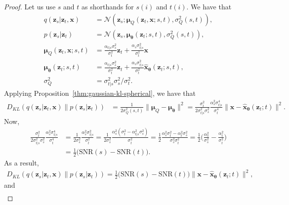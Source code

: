 \documentclass[10pt]{article}
\newcommand{\ve}[1]{\mathbf{#1}}
\newcommand{\ves}[1]{\boldsymbol{#1}}
\newcommand{\mcal}[1]{\mathcal{#1}}
\newcommand{\SNR}{\mathrm{SNR}}
\begin{document}
\begin{itemize}
\begin{proof}
  Let us use $s$ and $t$ as shorthands for $s(i)$ and $t(i)$. We have that
  \begin{align*}
    q(\ve{z}_s | \ve{z}_t, \ve{x})
    &= \mcal{N}(\ve{z}_s; \ves{\mu}_Q(\ve{z}_t, \ve{x}; s,t), \sigma^2_Q(s,t)),\\
    p(\ve{z}_s | \ve{z}_t)
    &= \mcal{N}(\ve{z}_s, \ves{\mu}_{\ves{\theta}}(\ve{z}_t; s, t), \sigma^2_Q(s,t)), \\
    \ves{\mu}_Q(\ve{z}_t, \ve{x}; s,t) 
    &= \frac{\alpha_{t|s}\sigma_s^2}{\sigma_t^2} \ve{z}_t + \frac{\alpha_s \sigma_{t|s}^2}{\sigma_t^2} \ve{x} \\
    \ves{\mu}_{\ves{\theta}}(\ve{z}_t; s, t) 
    &= \frac{\alpha_{t|s}\sigma_s^2}{\sigma_t^2} \ve{z}_t + \frac{\alpha_s \sigma_{t|s}^2}{\sigma_t^2} \hat{\ve{x}}_{\ves{\theta}}(\ve{z}_t; s, t), \\
    \sigma_Q^2 
    &= \sigma_{t|s}^2 \sigma_s^2 / \sigma_t^2.
  \end{align*}
  Applying Proposition~\ref{thm:gaussian-kl-spherical}, we have that
  \begin{align*}
    D_{KL}(
      q(\ve{z}_s | \ve{z}_t, \ve{x})
      \| p(\ve{z}_s | \ve{z}_t) )
    &= \frac{1}{2 \sigma^2_Q(s,t)} \| \ves{\mu}_Q - \ves{\mu}_{\ves{\theta}} \|^2 
    = \frac{\sigma_t^2}{2 \sigma_{t|s}^2 \sigma_s^2} \frac{\alpha_s^2 \sigma_{t|s}^4}{\sigma_t^4} 
    \| \ve{x} - \hat{\ve{x}}_{\ves{\theta}}(\ve{z}_t; t) \|^2.
  \end{align*}
  Now,
  \begin{align*}
    \frac{\sigma_t^2}{2 \sigma_{t|s}^2 \sigma_s^2} \frac{\alpha_s^2 \sigma_{t|s}^4}{\sigma_t^4}
    &= \frac{1}{2 \sigma_s^2} \frac{\alpha_s^2 \sigma_{t|s}^2}{\sigma_t^2}
    = \frac{1}{2 \sigma_s^2} \frac{\alpha_s^2 (\sigma_t^2 - \alpha_{t|s}^2 \sigma_s^2)}{\sigma_t^2}
    = \frac{1}{2} \frac{\alpha_s^2 \sigma_t^2 - \alpha_t^2 \sigma_s^2}{ \sigma_s^2 \sigma_t^2}
    = \frac{1}{2} \bigg( \frac{\alpha_s^2}{\sigma_s^2} - \frac{\alpha_t^2}{\sigma_t^2} \bigg) \\
    &= \frac{1}{2} \big( \SNR(s) - \SNR(t) \big).
  \end{align*}
  As a result,
  \begin{align*}
  D_{KL}(
      q(\ve{z}_s | \ve{z}_t, \ve{x})
      \| p(\ve{z}_s | \ve{z}_t) )
  = \frac{1}{2} \big( \SNR(s) - \SNR(t) \big) \| \ve{x} - \hat{\ve{x}}_{\ves{\theta}}(\ve{z}_t; t) \|^2,
  \end{align*}
  and
  \begin{align*}

\end{align*}
\end{proof}
\end{itemize}
\end{document}
